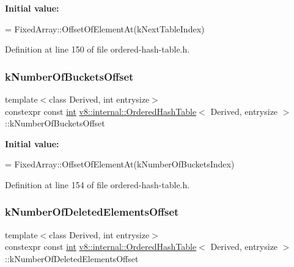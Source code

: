 {\bfseries Initial value\+:}
\begin{DoxyCode}
=
      FixedArray::OffsetOfElementAt(kNextTableIndex)
\end{DoxyCode}


Definition at line 150 of file ordered-\/hash-\/table.\+h.

\mbox{\label{classv8_1_1internal_1_1OrderedHashTable_a5ad2e04ff12582b0461e05efe781031e}} 
\subsubsection{\texorpdfstring{k\+Number\+Of\+Buckets\+Offset}{kNumberOfBucketsOffset}}
{\footnotesize\ttfamily template$<$class Derived, int entrysize$>$ \\
constexpr const \mbox{\hyperlink{classint}{int}} \mbox{\hyperlink{classv8_1_1internal_1_1OrderedHashTable}{v8\+::internal\+::\+Ordered\+Hash\+Table}}$<$ Derived, entrysize $>$\+::k\+Number\+Of\+Buckets\+Offset\hspace{0.3cm}{\ttfamily [static]}}

{\bfseries Initial value\+:}
\begin{DoxyCode}
=
      FixedArray::OffsetOfElementAt(kNumberOfBucketsIndex)
\end{DoxyCode}


Definition at line 154 of file ordered-\/hash-\/table.\+h.

\mbox{\label{classv8_1_1internal_1_1OrderedHashTable_a3f835840327f3655e351cebac5759d36}} 
\subsubsection{\texorpdfstring{k\+Number\+Of\+Deleted\+Elements\+Offset}{kNumberOfDeletedElementsOffset}}
{\footnotesize\ttfamily template$<$class Derived, int entrysize$>$ \\
constexpr const \mbox{\hyperlink{classint}{int}} \mbox{\hyperlink{classv8_1_1internal_1_1OrderedHashTable}{v8\+::internal\+::\+Ordered\+Hash\+Table}}$<$ Derived, entrysize $>$\+::k\+Number\+Of\+Deleted\+Elements\+Offset\hspace{0.3cm}{\ttfamily [static]}}

